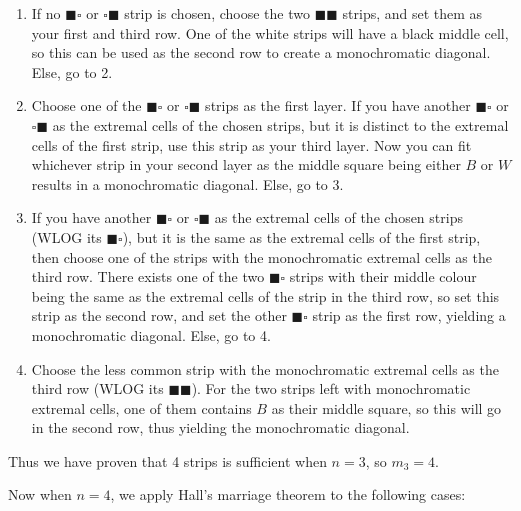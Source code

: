 \documentclass[10pt]{article}
\newcommand{\ws}{\square}
\newcommand{\bs}{\blacksquare}
\begin{document}
	\begin{enumerate}
	\item If no $\bs \ws$ or $\ws \bs$ strip is chosen, choose the two $\bs \bs$ strips, and set them as your first and third row. One of the white strips will have a black middle cell, so this can be used as the second row to create a monochromatic diagonal. Else, go to 2. 
	
	\item Choose one of the $\bs \ws$ or $\ws \bs$ strips as the first layer. If you have another $\bs \ws$ or $\ws \bs$ as the extremal cells of the chosen strips, but it is distinct to the extremal cells of the first strip, use this strip as your third layer. Now you can fit whichever strip in your second layer as the middle square being either $B$ or $W$ results in a monochromatic diagonal. Else, go to 3.
	
	\item If you have another $\bs \ws$ or $\ws \bs$ as the extremal cells of the chosen strips (WLOG its $\bs \ws$), but it is the same as the extremal cells of the first strip, then choose one of the strips with the monochromatic extremal cells as the third row. There exists one of the two $\bs \ws$ strips with their middle colour being the same as the extremal cells of the strip in the third row, so set this strip as the second row, and set the other $\bs \ws$ strip as the first row, yielding a monochromatic diagonal. Else, go to 4.
	
	\item Choose the less common strip with the monochromatic extremal cells as the third row (WLOG its $\bs \bs$). For the two strips left with monochromatic extremal cells, one of them contains $B$ as their middle square, so this will go in the second row, thus yielding the monochromatic diagonal.
	\end{enumerate}
	Thus we have proven that 4 strips is sufficient when $n=3$, so $m_3 = 4$.
	
	Now when \(n = 4\), we apply Hall's marriage theorem to the following cases:
	
\end{document}

